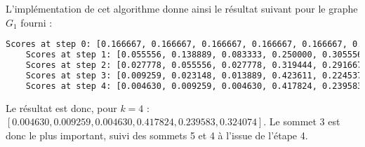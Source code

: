 L'implémentation de cet algorithme donne ainsi le résultat suivant pour le graphe $G_1$ fourni :

\begin{minipage}{\dimexpr\linewidth-20pt}
\begin{lstlisting}[language=bash, caption={Résultat de l'algorithme PageRank sur le graphe $G_1$ fourni, pour $k = 4$.}]
    Scores at step 0: [0.166667, 0.166667, 0.166667, 0.166667, 0.166667, 0.166667]
    Scores at step 1: [0.055556, 0.138889, 0.083333, 0.250000, 0.305556, 0.166667]
    Scores at step 2: [0.027778, 0.055556, 0.027778, 0.319444, 0.291667, 0.277778]
    Scores at step 3: [0.009259, 0.023148, 0.013889, 0.423611, 0.224537, 0.305556]
    Scores at step 4: [0.004630, 0.009259, 0.004630, 0.417824, 0.239583, 0.324074]
\end{lstlisting}
\end{minipage}

Le résultat est donc, pour $k = 4$ : $[0.004630, 0.009259, 0.004630, 0.417824, 0.239583, 0.324074]$. Le sommet 3 est donc le plus important, suivi des sommets 5 et 4 à l'issue de l'étape 4.


